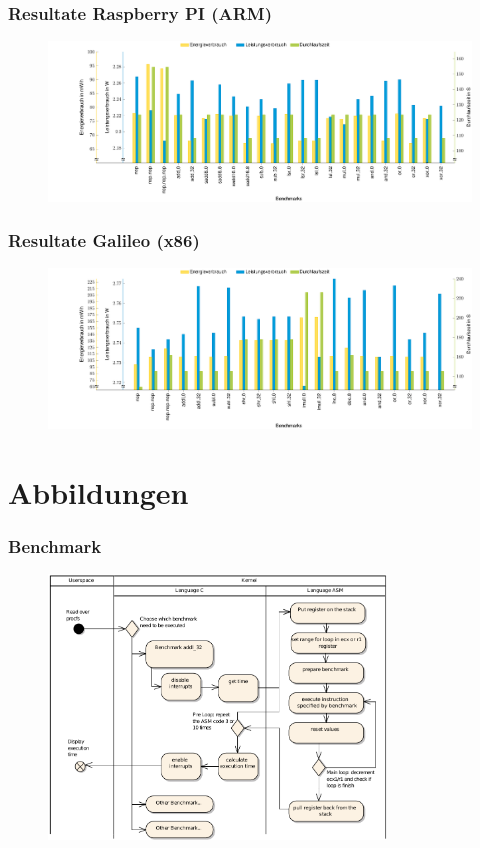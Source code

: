 \documentclass{beamer}
\begin{document}
\begin{frame}
\frametitle{Resultate Raspberry PI (ARM)}
\begin{figure}[H]
\centering
\includegraphics[width=1\textwidth]{raspberry_results.pdf}
\end{figure}
\end{frame}

\begin{frame}
\frametitle{Resultate Galileo (x86)}
\begin{figure}[H]
\centering
\includegraphics[width=1\textwidth]{galileo_results.pdf}
\end{figure}
\end{frame}

\section{Abbildungen} 
\begin{frame}
\frametitle{Benchmark}
\begin{figure}[H]
\centering
\includegraphics[width=0.8\textwidth]{../thesis/images/benchmark_ea.pdf}
\end{figure}
\end{frame}
\end{document}
